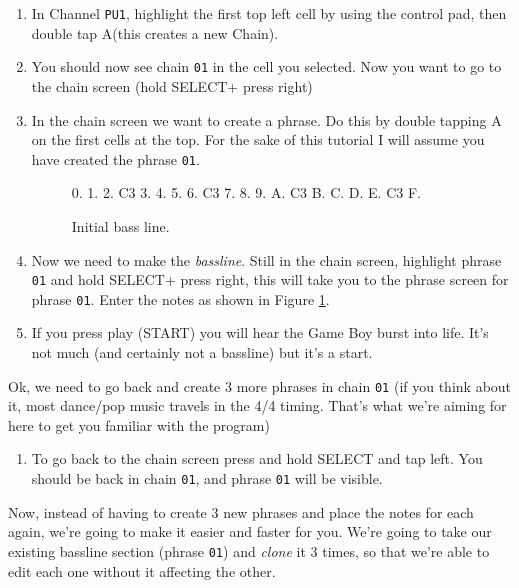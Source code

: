\documentclass[]{article}
\newcommand{\buttonStyle}[1]{\textsf{#1}\xspace}
\newcommand{\bA}{\buttonStyle{A}}
\newcommand{\bStart}{\buttonStyle{{START}}}
\newcommand{\bSelect}{\buttonStyle{{SELECT}}}
\newcommand{\bRight}{\buttonStyle{right}}
\newcommand{\bLeft}{\buttonStyle{left}}
\newcommand{\gbtxt}[1]{\texttt{#1}\xspace}
\begin{document}
\begin{enumerate}

\item In Channel \gbtxt{PU1}, highlight the first top left cell by using the control pad, then double tap \bA (this creates a new Chain).

\item You should now see chain \gbtxt{01} in the cell you selected. Now you want to go to the chain screen (hold \bSelect + press \bRight)

\item In the chain screen we want to create a phrase. Do this by double tapping \bA on the first cells at the top. For the sake of this tutorial I will assume you have created the phrase \gbtxt{01}.

\begin{figure}
\begin{notes}
0.
1.
2. C3
3.
4.
5.
6. C3
7.
8.
9.
A. C3
B.
C.
D.
E. C3
F.
\end{notes}	
\caption{Initial bass line.}\label{bassline}
\end{figure}

\item Now we need to make the \textit{bassline}. Still in the chain screen, highlight phrase \gbtxt{01} and hold \bSelect + press \bRight, this will take you to the phrase screen for phrase \gbtxt{01}. Enter the notes as shown in Figure \ref{bassline}.


\item If you press play (\bStart) you will hear the Game Boy burst into life. It's not much (and certainly not a bassline) but it's a start.

\end{enumerate}

Ok, we need to go back and create 3 more phrases in chain \gbtxt{01} (if you think about it, most dance/pop music travels in the 4/4 timing. That's what we're aiming for here to get you familiar with the program) %

\begin{enumerate}[resume]


\item To go back to the chain screen press and hold \bSelect and tap \bLeft. You should be back in chain \gbtxt{01}, and phrase \gbtxt{01} will be visible.

\end{enumerate}

Now, instead of having to create 3 new phrases and place the notes for each again, we're going to make it easier and faster for you. We're going to take our existing bassline section (phrase \gbtxt{01}) and \textit{clone} it 3 times, so that we're able to edit each one without it affecting the other. 
\end{document}

